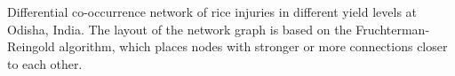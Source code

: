 Differential co-occurrence network of rice injuries in different yield levels at Odisha, India. The layout of the network graph is based on the Fruchterman-Reingold algorithm, which places nodes with stronger or more connections closer to each other.
\label{fig:difyieldOD}